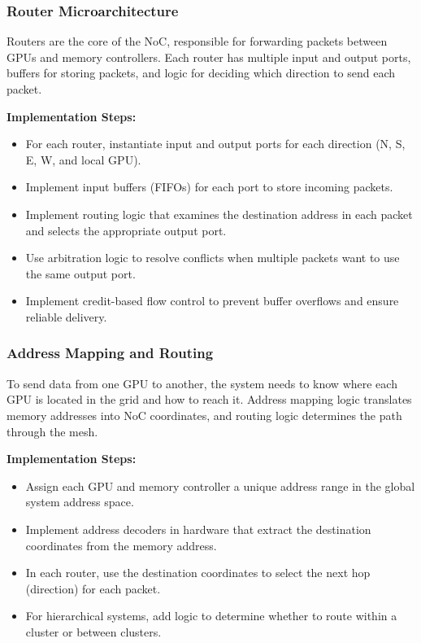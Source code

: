 \documentclass[11pt,a4paper]{article}
\begin{document}
\subsubsection{Router Microarchitecture}
Routers are the core of the NoC, responsible for forwarding packets between GPUs and memory controllers. Each router has multiple input and output ports, buffers for storing packets, and logic for deciding which direction to send each packet.

\textbf{Implementation Steps:}
\begin{itemize}
    \item For each router, instantiate input and output ports for each direction (N, S, E, W, and local GPU).
    \item Implement input buffers (FIFOs) for each port to store incoming packets.
    \item Implement routing logic that examines the destination address in each packet and selects the appropriate output port.
    \item Use arbitration logic to resolve conflicts when multiple packets want to use the same output port.
    \item Implement credit-based flow control to prevent buffer overflows and ensure reliable delivery.
\end{itemize}

\subsubsection{Address Mapping and Routing}
To send data from one GPU to another, the system needs to know where each GPU is located in the grid and how to reach it. Address mapping logic translates memory addresses into NoC coordinates, and routing logic determines the path through the mesh.

\textbf{Implementation Steps:}
\begin{itemize}
    \item Assign each GPU and memory controller a unique address range in the global system address space.
    \item Implement address decoders in hardware that extract the destination coordinates from the memory address.
    \item In each router, use the destination coordinates to select the next hop (direction) for each packet.
    \item For hierarchical systems, add logic to determine whether to route within a cluster or between clusters.
\end{itemize}
\end{document}
